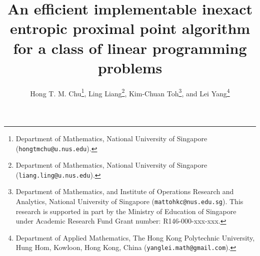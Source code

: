 \documentclass[10pt]{article}
\begin{document}



\title{An efficient implementable inexact entropic proximal point algorithm for a class of linear programming problems}
\author{
Hong T. M. Chu\thanks{Department of Mathematics, National University of Singapore ({\tt hongtmchu@u.nus.edu}).},\;
%
Ling Liang\thanks{Department of Mathematics, National University of Singapore ({\tt liang.ling@u.nus.edu}).},\;
%
Kim-Chuan Toh\thanks{Department of Mathematics, and Institute of Operations Research and Analytics, National University of Singapore ({\tt mattohkc@nus.edu.sg}). This research is supported in part by the  Ministry of Education of Singapore under Academic Research Fund Grant number: R146-000-xxx-xxx.
},\;
%
and
%
Lei Yang\thanks{Department of Applied Mathematics, The Hong Kong Polytechnic University, Hung Hom, Kowloon, Hong Kong, China ({\tt yanglei.math@gmail.com}).}
}
\maketitle
\end{document}
